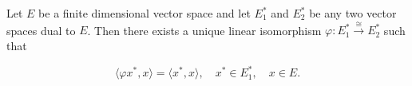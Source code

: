 Let $E$ be a finite dimensional vector space and let $E_1^*$ and $E_2^*$ be any two vector spaces dual to $E$. Then there exists a unique linear isomorphism $\varphi: E_1^* \xrightarrow{\cong} E_2^*$ such that

$$\langle \varphi x^*, x \rangle = \langle x^*, x \rangle, \quad x^* \in E_1^*, \quad x \in E.$$
